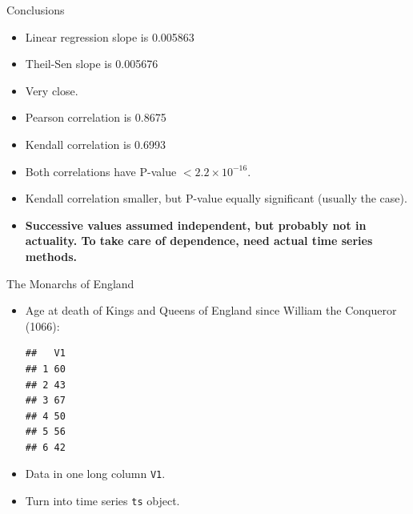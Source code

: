 \begin{frame}[fragile]{Conclusions}
  
  \begin{itemize}
\item Linear regression slope is 0.005863
\item Theil-Sen slope is 0.005676
\item Very close.
\item Pearson correlation is 0.8675
\item Kendall correlation is 0.6993
\item Both correlations have P-value $< 2.2 \times 10^{-16}$. 
\item Kendall correlation smaller, but P-value equally significant
  (usually the case). 

\item \textbf{Successive values assumed independent, but probably not
    in actuality. To take care of dependence, need actual time series methods.}
  \end{itemize}
  
\end{frame}

\begin{frame}[fragile]{The Monarchs of England}
  \begin{itemize}
  \item Age at death of Kings and Queens of England since William the
    Conqueror (1066):
\begin{knitrout}
\color{fgcolor}\begin{kframe}
\begin{alltt}
\hlkwb{=}\hlstd{(}\hlstd{,}
\end{alltt}
\begin{verbatim}
##   V1
## 1 60
## 2 43
## 3 67
## 4 50
## 5 56
## 6 42
\end{verbatim}
\end{kframe}
\end{knitrout}

\item Data in one long column \texttt{V1}.
\item Turn into time series \texttt{ts} object.
  
\begin{knitrout}
\color{fgcolor}\begin{kframe}
\begin{alltt}
\hlkwb{=}
\end{alltt}
\end{kframe}
\end{knitrout}

  \end{itemize}
\end{frame}

